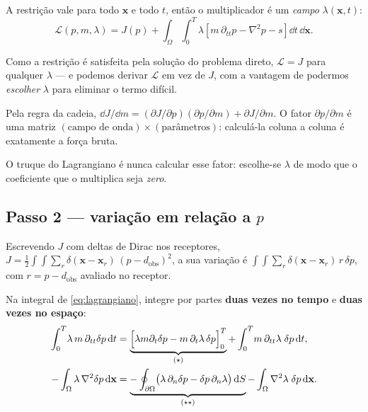 \documentclass[11pt,a4paper,oneside]{report}
\begin{document}
A restri\c{c}\~ao vale para todo $\mathbf{x}$ e todo $t$, ent\~ao o
multiplicador \'e um \emph{campo} $\lambda(\mathbf{x},t)$:
\begin{equation}
\mathcal{L}(p, m, \lambda) = J(p) + \int_{\Omega}\!\!\int_{0}^{T}
\lambda\left[m\,\partial_{tt}p - \nabla^{2}p - s\right] \dd t\,\dd\mathbf{x}.
\label{eq:lagrangiano}
\end{equation}

Como a restri\c{c}\~ao \'e satisfeita pela solu\c{c}\~ao do problema direto,
$\mathcal{L} = J$ para qualquer $\lambda$ --- e podemos derivar $\mathcal{L}$
em vez de $J$, com a vantagem de podermos \emph{escolher} $\lambda$ para
eliminar o termo dif\'icil.

\begin{teoria}
Pela regra da cadeia, $\dd J/\dd m = (\partial J/\partial p)(\partial p/
\partial m) + \partial J/\partial m$. O fator $\partial p/\partial m$ \'e uma
matriz $(\text{campo de onda}) \times (\text{par\^ametros})$: calcul\'a-la
coluna a coluna \'e exatamente a for\c{c}a bruta.

O truque do Lagrangiano \'e nunca calcular esse fator: escolhe-se $\lambda$
de modo que o coeficiente que o multiplica seja \emph{zero}.
\end{teoria}

\subsection*{Passo 2 --- varia\c{c}\~ao em rela\c{c}\~ao a $p$}

Escrevendo $J$ com deltas de Dirac nos receptores,
$J = \tfrac12\int\!\!\int \sum_r \delta(\mathbf{x}-\mathbf{x}_r)\,
(p - d_{\text{obs}})^{2}$, a sua varia\c{c}\~ao \'e
$\int\!\!\int \sum_r \delta(\mathbf{x}-\mathbf{x}_r)\,r\,\delta p$, com
$r = p - d_{\text{obs}}$ avaliado no receptor.

Na integral de \eqref{eq:lagrangiano}, integre por partes \textbf{duas vezes
no tempo} e \textbf{duas vezes no espa\c{c}o}:
\begin{align}
\int_{0}^{T}\!\lambda\,m\,\partial_{tt}\delta p \,\mathrm{d} t
 &= \underbrace{\Bigl[\lambda m \partial_t \delta p
    - m\,\partial_t\lambda\,\delta p\Bigr]_{0}^{T}}_{(\star)}
  + \int_{0}^{T}\! m\,\partial_{tt}\lambda\;\delta p \,\mathrm{d} t, \\
-\int_{\Omega}\lambda\,\nabla^{2}\delta p \,\mathrm{d}\mathbf{x}
 &= \underbrace{-\oint_{\partial\Omega}
     \bigl(\lambda\,\partial_n \delta p
     - \delta p\,\partial_n\lambda\bigr)\,\mathrm{d} S}_{(\star\star)}
  - \int_{\Omega} \nabla^{2}\lambda\;\delta p \,\mathrm{d}\mathbf{x}.
\end{align}
\end{document}
